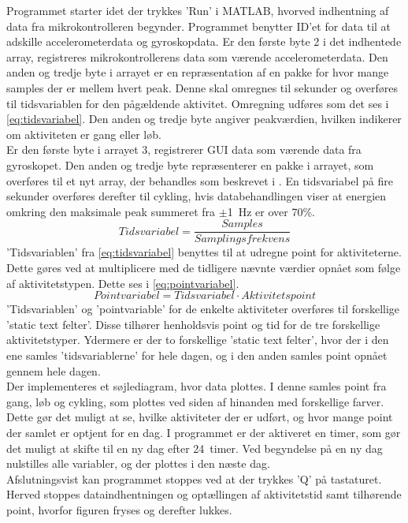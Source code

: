 Programmet starter idet der trykkes 'Run' i MATLAB, hvorved indhentning af data fra mikrokontrolleren begynder. Programmet benytter ID'et for data til at adskille accelerometerdata og gyroskopdata. Er den første byte 2 i det indhentede array, registreres mikrokontrollerens data som værende accelerometerdata. Den anden og tredje byte i arrayet er en repræsentation af en pakke for hvor mange samples der er mellem hvert peak. Denne skal omregnes til sekunder og overføres til tidsvariablen for den pågældende aktivitet. Omregning udføres som det ses i \eqref{eq:tidsvariabel}. Den anden og tredje byte angiver peakværdien, hvilken indikerer om aktiviteten er gang eller løb. \\
Er den første byte i arrayet 3, registrerer GUI data som værende data fra gyroskopet. Den anden og tredje byte repræsenterer en pakke i arrayet, som overføres til et nyt array, der behandles som beskrevet i . En tidsvariabel på fire sekunder overføres derefter til cykling, hvis databehandlingen viser at energien omkring den maksimale peak summeret fra $\pm$1~Hz er over 70\%. 
\begin{equation}
Tidsvariabel = \frac{Samples}{Samplingsfrekvens}
\label{eq:tidsvariabel}
\end{equation}
'Tidsvariablen' fra \eqref{eq:tidsvariabel} benyttes til at udregne point for aktiviteterne. Dette gøres ved at multiplicere med de tidligere nævnte værdier opnået som følge af aktivitetstypen. Dette ses i \eqref{eq:pointvariabel}. 
\begin{equation}
Pointvariabel = Tidsvariabel \cdot Aktivitetspoint
\label{eq:pointvariabel}
\end{equation}
'Tidsvariablen' og 'pointvariable' for de enkelte aktiviteter overføres til forskellige 'static text felter'. Disse tilhører henholdsvis point og tid for de tre forskellige aktivitetstyper. Ydermere er der to forskellige 'static text felter', hvor der i den ene samles 'tidsvariablerne' for hele dagen, og i den anden samles point opnået gennem hele dagen. \\
Der implementeres et søjlediagram, hvor data plottes. I denne samles point fra gang, løb og cykling, som plottes ved siden af hinanden med forskellige farver. Dette gør det muligt at se, hvilke aktiviteter der er udført, og hvor mange point der samlet er optjent for en dag. I programmet er der aktiveret en timer, som gør det muligt at skifte til en ny dag efter 24~timer. Ved begyndelse på en ny dag nulstilles alle variabler, og der plottes i den næste dag.\\ 
Afslutningsvist kan programmet stoppes ved at der trykkes 'Q' på tastaturet. Herved stoppes dataindhentningen og optællingen af aktivitetstid samt tilhørende point, hvorfor figuren fryses og derefter lukkes. 

